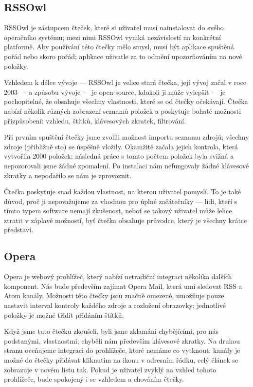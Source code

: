 \subsection{RSSOwl}

RSSOwl je zástupcem čteček, které si uživatel musí nainstalovat do svého operačního systému; mezi nimi RSSOwl vyniká nezávislostí na konkrétní platformě.
Aby používání této čtečky mělo smysl, musí být aplikace spuštěná pořád nebo skoro pořád; aplikace uživatle za to odmění upozorňováním na nové položky.

Vzhledem k délce vývoje --- RSSOwl je velice stará čtečka, její vývoj začal v roce 2003 --- a způsobu vývoje --- je open-source, kdokoli ji může vylepšit --- je pochopitelné, že obsahuje všechny vlastnosti, které se od čtečky očekávají.
Čtečka nabízí několik různých zobrazení seznamů položek a poskytuje bohaté možnosti přizpůsobení: vzhledu, štítků, klávesových zkratek, filtrování.

Při prvním spuštění čtečky jsme zvolili možnost importu seznamu zdrojů; všechny zdroje (přibližně sto) se úspěšně vložily.
Okamžitě začala jejich kontrola, která vytvořila 2000 položek; následná práce s tomto počtem položek byla svižná a nepozorovali jsme žádné zpomalení.
Po instalaci nám nefungovaly žádné klávesové zkratky a nepodařilo se nám je zprovoznit.

Čtečka poskytuje snad každou vlastnost, na kterou uživatel pomyslí.
To je také důvod, proč ji nepovažujeme za vhodnou pro úplné začátečníky --- lidi, kteří s tímto typem software nemají zkušenost, neboť se takový uživatel může lehce ztratit v záplavě možností, byť čtečka obsahuje průvodce, který je všechny krátce představí.

\subsection{Opera}

Opera je webový prohlížeč, který nabízí netradiční integraci několika dalších komponent.
Nás bude především zajímat Opera Mail, která umí sledovat RSS a Atom kanály.
Možnosti této čtečky jsou značně omezené, umožňuje pouze nastavit interval kontroly každého zdroje a rozložení obrazovky; jednotlivé položky je možné třidit přidáním štítků.

Když jsme tuto čtečku zkoušeli, byli jsme zklamáni chybějícími, pro nás podstanými, vlastnostmi; chyběli nám především klávesové zkratky.
Na druhou stranu oceňujeme integraci do prohlížeče, které nemáme co vytknout: kanály je možné do čtečky přidávat kliknutím na ikonu v adresním řádku, celý článek se zobrazuje v novém listu tak.
Pokud je uživatel zvyklý na vzhled tohoto prohlížeče, bude spokojený i se vzhledem a chováním čtečky.

